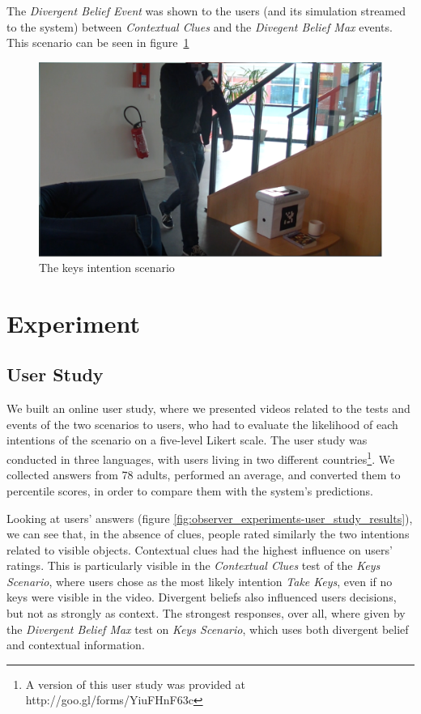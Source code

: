 The \textit{Divergent Belief Event} was shown to the users (and its simulation streamed to the system) between \textit{Contextual Clues} and the \textit{Divegent Belief Max} events. This scenario can be seen in figure~\ref{fig:observer_experiments-keys}

 \begin{figure}[ht!]
	\centering
	\includegraphics[scale=0.5]{img/observer/keys2-blur.pdf}
	\caption{The keys intention scenario}
	\label{fig:observer_experiments-keys}
\end{figure}

\section{Experiment}
\label{sec:observer_experiment-experiment}
\subsection{User Study}
We built an online user study, where we presented videos related to the tests and events of the two scenarios to users, who had to evaluate the likelihood of each intentions of the scenario
on a five-level Likert scale. The user study was conducted in three languages, with users living in two different countries\footnote{A version of this user study was provided at http://goo.gl/forms/YiuFHnF63c}. We collected answers from 78 adults, performed an average, and converted them to percentile scores, in order to compare them with the system's predictions.

Looking at users' answers (figure \ref{fig:observer_experiments-user_study_results}), we can see that, in the absence of clues, people rated similarly the two intentions related to visible objects. Contextual clues had the highest influence on users' ratings. This is particularly visible in the \textit{Contextual Clues} test of the \textit{Keys Scenario}, where users chose as the most likely intention \textit{Take Keys}, even if no keys were visible in the video. Divergent beliefs also influenced users decisions, but not as strongly as context. The strongest responses, over all, where given by the \textit{Divergent Belief Max} test on \textit{Keys Scenario}, which uses both divergent belief and contextual information.

